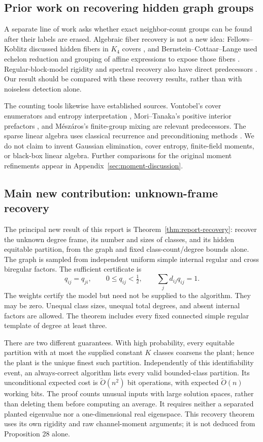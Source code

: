 \subsection{Prior work on recovering hidden graph groups}
A separate line of work asks whether exact neighbor-count groups can be
found after their labels are erased. Algebraic fiber recovery is not a
new idea: Fellows--Koblitz discussed hidden fibers in $K_4$ covers
\cite{rec:KidKrypto}, and Bernstein--Cottaar--Lange used echelon
reduction and grouping of affine expressions to expose those fibers
\cite{rec:BCL}. Regular-block-model rigidity and spectral recovery
also have direct predecessors \cite{rec:BDGHT,rec:Barucca,rec:KP,BDH}.
Our result should be compared with these recovery results, rather than
with noiseless detection alone.

The counting tools likewise have established sources. Vontobel's
cover enumerators and entropy interpretation \cite{rec:Vontobel},
Mori--Tanaka's positive interior prefactors \cite{rec:MoriTanaka},
and M\'esz\'aros's finite-group mixing \cite{rec:Meszaros} are relevant
predecessors. The sparse linear algebra uses classical recurrence and
preconditioning methods \cite{rec:Wiedemann,rec:Chen}. We do not claim
to invent Gaussian elimination, cover entropy, finite-field moments,
or black-box linear algebra. Further comparisons for the original
moment refinements appear in Appendix~\ref{sec:moment-discussion}.

\subsection{Main new contribution: unknown-frame recovery}
The principal new result of this report is
Theorem~\ref{thm:report-recovery}: recover the unknown degree frame,
its number and sizes of classes, and its hidden equitable partition,
from the graph and fixed class-count/degree bounds alone. The graph is
sampled from independent uniform simple internal regular and cross
biregular factors. The sufficient certificate is
\[
 q_{ij}=q_{ji},\qquad 0\le q_{ij}<\tfrac12,\qquad
                          \sum_jd_{ij}q_{ij}=1.
\]
The weights certify the model but need not be supplied to the algorithm.
They may be zero. Unequal class sizes, unequal total degrees, and absent
internal factors are allowed. The theorem includes every fixed connected
simple regular template of degree at least three.

There are two different guarantees. With high probability, every equitable
partition with at most the supplied constant $K$ classes coarsens the
plant; hence the plant is the unique finest such partition. Independently
of this identifiability event, an always-correct algorithm lists every
valid bounded-class partition. Its unconditional expected cost is
$\widetilde O(n^2)$ bit operations, with expected
$\widetilde O(n)$ working bits. The proof counts unusual inputs with large
solution spaces, rather than deleting them before computing an average.
It requires neither a separated planted eigenvalue nor a one-dimensional
real eigenspace. This recovery theorem uses its own rigidity and raw
channel-moment arguments; it is not deduced from Proposition 28 alone.

